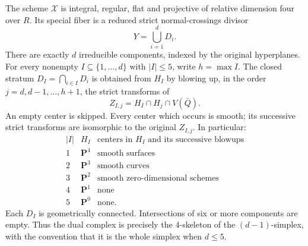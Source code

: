 \begin{theorem}
\label{r18hp:model}
The scheme $\mathcal X$ is integral, regular, flat and projective
of relative dimension four over $R$.  Its special fiber is a
reduced strict normal-crossings divisor
\[
                         Y=\bigcup_{i=1}^d D_i.
 \tag{HP18.4}\label{r18hp:fiber}
\]
There are exactly $d$ irreducible components, indexed by the original
hyperplanes.  For every nonempty $I\subseteq\{1,\ldots,d\}$ with
$|I|\le5$, write $h=\max I$.  The closed stratum
$D_I=\bigcap_{i\in I}D_i$ is obtained from $H_I$ by blowing up,
in the order $j=d,d-1,\ldots,h+1$, the strict transforms of
\[
                    Z_{I,j}=H_I\cap H_j\cap V(\bar Q).
 \tag{HP18.5}\label{r18hp:centers}
\]
An empty center is skipped.  Every center which occurs is smooth;
its successive strict transforms are isomorphic to the original
$Z_{I,j}$.  In particular:
\[
 \begin{array}{c|c|c}
 |I|&H_I&\text{centers in }H_I\text{ and its successive blowups}\\ \hline
 1&\mathbf P^4&\text{smooth surfaces}\\
 2&\mathbf P^3&\text{smooth curves}\\
 3&\mathbf P^2&\text{smooth zero-dimensional schemes}\\
 4&\mathbf P^1&\text{none}\\
 5&\mathbf P^0&\text{none}.
 \end{array}
 \tag{HP18.6}\label{r18hp:types}
\]
Each $D_I$ is geometrically connected.  Intersections of six or
more components are empty.  Thus the dual complex is precisely
the $4$-skeleton of the $(d-1)$-simplex, with the convention that
it is the whole simplex when $d\le5$.
\end{theorem}


